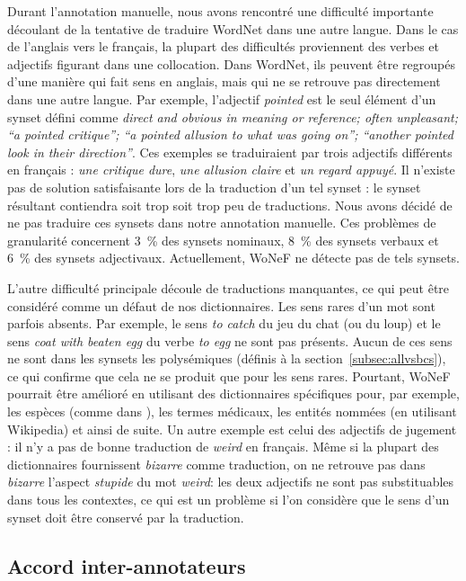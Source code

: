 Durant l'annotation manuelle, nous avons rencontré une difficulté importante
découlant de la tentative de traduire WordNet dans une autre langue. Dans le
cas de l'anglais vers le français, la plupart des difficultés proviennent des
verbes et adjectifs figurant dans une collocation. Dans WordNet, ils peuvent
être regroupés d'une manière qui fait sens en anglais, mais qui ne se retrouve
pas directement dans une autre langue. Par exemple, l'adjectif \textit{pointed}
est le seul élément d'un synset défini comme \textit{direct and obvious in
meaning or reference; often unpleasant; ``a pointed critique''; ``a pointed
allusion to what was going on''; ``another pointed look in their direction''}.
Ces exemples se traduiraient par trois adjectifs différents en français :
\textit{une critique dure}, \textit{une allusion claire} et \textit{un regard
appuyé}. Il n'existe pas de solution satisfaisante lors de la traduction d'un
tel synset : le synset résultant contiendra soit trop soit trop peu de
traductions. Nous avons décidé de ne pas traduire ces synsets dans notre
annotation manuelle. Ces problèmes de granularité concernent 3~\% des synsets
nominaux, 8~\% des synsets verbaux et 6~\% des synsets adjectivaux.
Actuellement, WoNeF ne détecte pas de tels synsets.

L'autre difficulté principale découle de traductions manquantes, ce qui peut
être considéré comme un défaut de nos dictionnaires. Les sens rares d'un mot
sont parfois absents. Par exemple, le sens \textit{to catch} du jeu du chat (ou
du loup) et le sens \textit{coat with beaten egg} du verbe \textit{to egg} ne
sont pas présents. Aucun de ces sens ne sont dans les synsets les polysémiques
(définis à la section~\ref{subsec:allvsbcs}), ce qui confirme que cela ne se
produit que pour les sens rares. Pourtant, WoNeF pourrait être amélioré en
utilisant des dictionnaires spécifiques pour, par exemple, les espèces (comme
dans \cite{sagot2008construction}), les termes médicaux, les entités nommées
(en utilisant Wikipedia) et ainsi de suite. Un autre exemple est celui des
adjectifs de jugement : il n'y a pas de bonne traduction de \textit{weird} en
français. Même si la plupart des dictionnaires fournissent \textit{bizarre}
comme traduction, on ne retrouve pas dans \textit{bizarre} l'aspect
\textit{stupide} du mot \textit{weird}: les deux adjectifs ne sont pas
substituables dans tous les contextes, ce qui est un problème si l'on considère
que le sens d'un synset doit être conservé par la traduction.

\subsection{Accord inter-annotateurs}
\label{subsec:interannotator_agreement}

